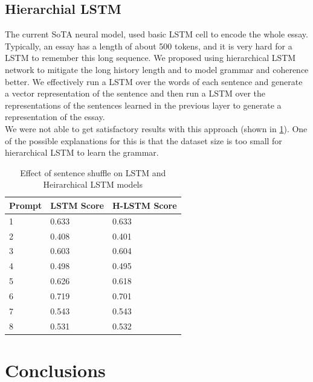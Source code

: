\documentclass[11pt,a4paper]{article}
\newcommand{\acomment}[1]{{\bf{\color{blue}{{[Aman: #1]}}}}}
\begin{document}
\subsection{Hierarchial LSTM}

The current SoTA neural model, used basic LSTM cell to encode the whole essay. Typically, an essay has a length of about 500 tokens, and it is very hard for a LSTM to remember this long sequence. We proposed using hierarchical LSTM network to mitigate the long history length and to model grammar and coherence better. We effectively run a LSTM over the words of each sentence and generate a vector representation of the sentence and then run a LSTM over the representations of the sentences learned in the previous layer to generate a representation of the essay.\\ 
We were not able to get satisfactory results with this approach (shown in \cref{hlstm}). One of the possible explanations for this is that the dataset size is too small for hierarchical LSTM to learn the grammar.


\begin{table}[]
  \centering
  \begin{tabular}{|l|l|l|}
  \hline
  \textbf{Prompt} & \textbf{LSTM Score} & \textbf{H-LSTM Score} \\ \hline
  1 & 0.633 & 0.633 \\ \hline
  2 & 0.408 & 0.401 \\ \hline
  3 & 0.603 & 0.604 \\ \hline
  4 & 0.498 & 0.495 \\ \hline
  5 & 0.626 & 0.618 \\ \hline
  6 & 0.719 & 0.701 \\ \hline
  7 & 0.543 & 0.543 \\ \hline
  8 & 0.531 & 0.532 \\ \hline
  \end{tabular}
  \caption{Effect of sentence shuffle on LSTM and Heirarchical LSTM models}
  \label{hlstm}
\end{table}


\section{Conclusions}

\acomment{Write this up}




\FloatBarrier



\end{document}
